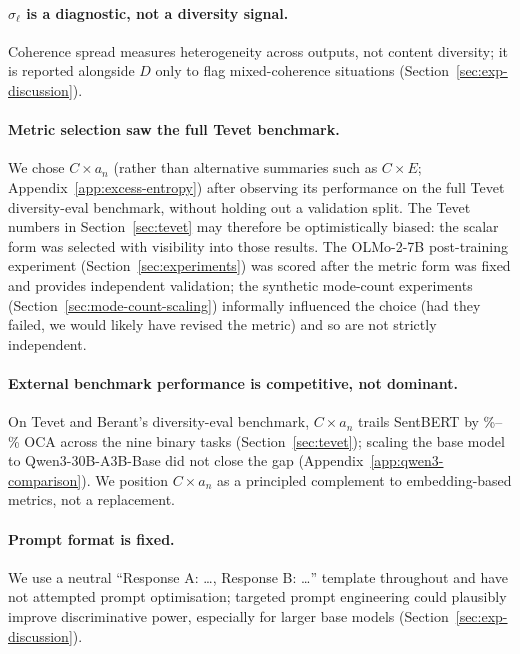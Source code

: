 \paragraph{$\sigma_\ell$ is a diagnostic, not a diversity signal.}
Coherence spread measures heterogeneity across outputs, not content diversity; it is reported alongside $D$ only to flag mixed-coherence situations (Section~\ref{sec:exp-discussion}).

\paragraph{Metric selection saw the full Tevet benchmark.}
We chose $C \times a_n$ (rather than alternative summaries such as $C \times E$; Appendix~\ref{app:excess-entropy}) after observing its performance on the full Tevet diversity-eval benchmark, without holding out a validation split.
The Tevet numbers in Section~\ref{sec:tevet} may therefore be optimistically biased: the scalar form was selected with visibility into those results.
The OLMo-2-7B post-training experiment (Section~\ref{sec:experiments}) was scored after the metric form was fixed and provides independent validation; the synthetic mode-count experiments (Section~\ref{sec:mode-count-scaling}) informally influenced the choice (had they failed, we would likely have revised the metric) and so are not strictly independent.

\paragraph{External benchmark performance is competitive, not dominant.}
On Tevet and Berant's diversity-eval benchmark, $C \times a_n$ trails SentBERT by \tevetCxAnVsSentBertOCAMinPct\%--\tevetCxAnVsSentBertOCAMaxPct\% OCA across the nine binary tasks (Section~\ref{sec:tevet}); scaling the base model to Qwen3-30B-A3B-Base did not close the gap (Appendix~\ref{app:qwen3-comparison}).
We position $C \times a_n$ as a principled complement to embedding-based metrics, not a replacement.

\paragraph{Prompt format is fixed.}
We use a neutral ``Response A: \ldots, Response B: \ldots'' template throughout and have not attempted prompt optimisation; targeted prompt engineering could plausibly improve discriminative power, especially for larger base models (Section~\ref{sec:exp-discussion}).

